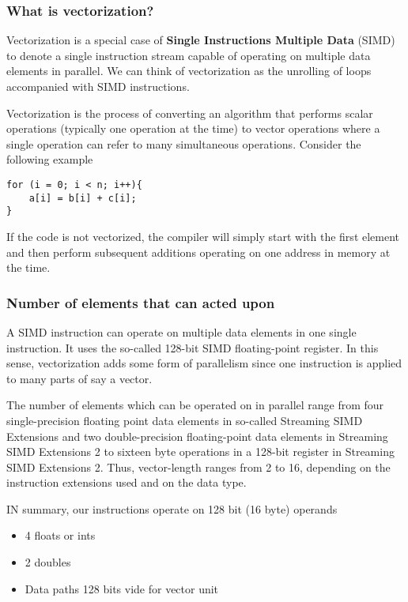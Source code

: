 \documentclass{beamer}
\begin{document}
\begin{frame}
\frametitle{What is vectorization?}

Vectorization is a special
case of \textbf{Single Instructions Multiple Data} (SIMD) to denote a single
instruction stream capable of operating on multiple data elements in
parallel. 
We can think of vectorization as the unrolling of loops accompanied with SIMD instructions.

Vectorization is the process of converting an algorithm that performs scalar operations
(typically one operation at the time) to vector operations where a single operation can refer to many simultaneous operations.
Consider the following example
\begin{verbatim}
for (i = 0; i < n; i++){
    a[i] = b[i] + c[i];
}
\end{verbatim}
If the code is not vectorized, the compiler will simply start with the first element and 
then perform subsequent additions operating on one address in memory at the time.
\end{frame}

\begin{frame}
\frametitle{Number of elements that can acted upon}

A SIMD instruction can operate  on multiple data elements in one single instruction.
It uses the so-called 128-bit SIMD floating-point register. 
In this sense, vectorization adds some form of parallelism since one instruction is applied  
to many parts of say a vector.

The number of elements which can be operated on in parallel
range from four single-precision floating point data elements in so-called 
Streaming SIMD Extensions and two double-precision floating-point data
elements in Streaming SIMD Extensions 2 to sixteen byte operations in
a 128-bit register in Streaming SIMD Extensions 2. Thus, vector-length
ranges from 2 to 16, depending on the instruction extensions used and
on the data type. 

IN summary, our instructions  operate on 128 bit (16 byte) operands
\begin{itemize}
\item 4 floats or ints

\item 2 doubles

\item Data paths 128 bits vide for vector unit
\end{itemize}

\noindent
\end{frame}
\end{document}
